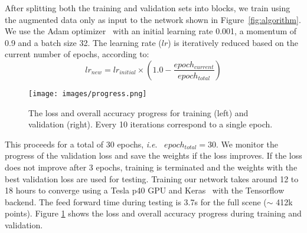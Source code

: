 \documentclass[final,3p,times,twocolumn,authoryear]{elsarticle}
\newcommand{\ie}{\textit{i}.\textit{e}.}
\begin{document}
After splitting both the training and validation sets into blocks, we train using the augmented data only as input to the network shown in Figure~\ref{fig:algorithm}. 
We use the Adam optimizer~\citep{Kingma2014AdamAM} with an initial learning rate 0.001, a momentum of 0.9 and a batch size 32. 
The learning rate ($lr$) is iteratively reduced based on the current number of epochs, according to:
\begin{equation}
\label{eq:lr}
lr_{new} = lr_{initial}\times(1.0-\frac{epoch_{current}}{epoch_{total}})
\end{equation}
\begin{figure}[t]
\begin{center}
\texttt{[image: images/progress.png]}
\end{center}
\caption{The loss and overall accuracy progress for training (left) and validation (right). Every 10 iterations correspond to a single epoch.}
\label{fig:progress}
\end{figure}
This proceeds for a total of 30 epochs, \ie~ $epoch_{total} = 30$. 
We monitor the progress of the validation loss and save the weights if the loss improves. 
If the loss does not improve after 3 epochs, training is terminated and the weights with the best validation loss are used for testing. 
Training our network takes around 12 to 18 hours to converge using a Tesla p40 GPU and Keras~\citep{keras} with the Tensorflow backend.
The feed forward time during testing is 3.7s for the full scene ($\sim$ 412k points).  
Figure \ref{fig:progress} shows the loss and overall accuracy progress during training and validation.
\end{document}
